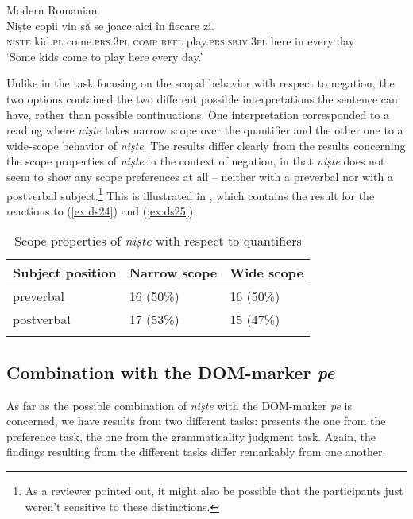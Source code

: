 \documentclass[output=paper,colorlinks,citecolor=brown]{langscibook}
\begin{document}
\ea\label{ex:ds25} Modern Romanian\\
\gll Niște copii vin s\u{a} se joace aici în fiecare zi.\\
     \textsc{niște} kid.\textsc{pl} come.\textsc{prs}.3\textsc{pl} \textsc{comp} \textsc{refl} play.\textsc{prs.sbjv}.3\textsc{pl} here in every day\\
\glt ‘Some kids come to play here every day.’
\z

Unlike in the task focusing on the scopal behavior with respect to negation, the two options contained the two different possible interpretations the sentence can have, rather than possible continuations. One interpretation corresponded to a reading where \textit{niște} takes narrow scope over the quantifier and the other one to a wide-scope behavior of \textit{niște}. The results differ clearly from the results concerning the scope properties of \textit{niște} in the context of negation, in that \textit{niște} does not seem to show any scope preferences at all -- neither with a preverbal nor with a postverbal subject.\footnote{As a reviewer pointed out, it might also be possible that the participants just weren’t sensitive to these distinctions.} This is illustrated in , which contains the result for the reactions to (\ref{ex:ds24}) and (\ref{ex:ds25}).

\begin{table}
\begin{tabular}{lll}
\lsptoprule
Subject position & Narrow scope & Wide scope\\
\midrule
preverbal & 16 (50\%) & 16 (50\%)\\
postverbal & 17 (53\%) & 15 (47\%)\\
\lspbottomrule
\end{tabular}
\caption{Scope properties of \textit{niște} with respect to quantifiers}
\label{tab:ds6}
\end{table}

\subsection{Combination with the DOM-marker \textit{pe}}\label{sec:ds4.5}
As far as the possible combination of \textit{niște} with the DOM-marker \textit{pe} is concerned, we have results from two different tasks:  presents the one from the preference task,  the one from the grammaticality judgment task. Again, the findings resulting from the different tasks differ remarkably from one another.
\end{document}

